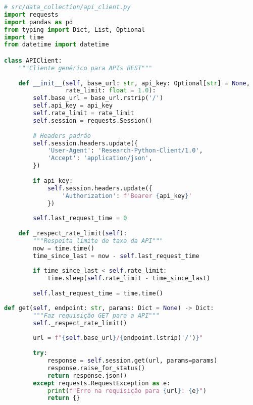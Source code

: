 \begin{pythonbox}
\begin{lstlisting}[language=Python]
# src/data_collection/api_client.py
import requests
import pandas as pd
from typing import Dict, List, Optional
import time
from datetime import datetime

class APIClient:
    """Cliente genérico para APIs REST"""
    
    def __init__(self, base_url: str, api_key: Optional[str] = None, 
                 rate_limit: float = 1.0):
        self.base_url = base_url.rstrip('/')
        self.api_key = api_key
        self.rate_limit = rate_limit
        self.session = requests.Session()
        
        # Headers padrão
        self.session.headers.update({
            'User-Agent': 'Research-Python-Client/1.0',
            'Accept': 'application/json',
        })
        
        if api_key:
            self.session.headers.update({
                'Authorization': f'Bearer {api_key}'
            })
            
        self.last_request_time = 0
        
    def _respect_rate_limit(self):
        """Respeita limite de taxa da API"""
        now = time.time()
        time_since_last = now - self.last_request_time
        
        if time_since_last < self.rate_limit:
            time.sleep(self.rate_limit - time_since_last)
            
        self.last_request_time = time.time()
\end{lstlisting}
\end{pythonbox}

\begin{pythonbox}
\begin{lstlisting}[language=Python]        
    def get(self, endpoint: str, params: Dict = None) -> Dict:
        """Faz requisição GET para a API"""
        self._respect_rate_limit()
        
        url = f"{self.base_url}/{endpoint.lstrip('/')}"
        
        try:
            response = self.session.get(url, params=params)
            response.raise_for_status()
            return response.json()
        except requests.RequestException as e:
            print(f"Erro na requisição para {url}: {e}")
            return {}
\end{lstlisting}
\end{pythonbox}


